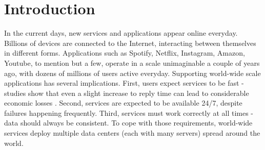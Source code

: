 
%

\chapter{Introduction}
\label{cha:introduction}





In the current days, new services and applications appear online everyday.
Billions of devices are connected to the Internet, interacting between themselves in different forms.
Applications such as Spotify, Netflix, Instagram, Amazon, Youtube, to mention but a few, operate in a scale unimaginable a couple of years ago, with dozens of millions of users active everyday.
Supporting world-wide scale applications has several implications.
First, users expect services to be fast - studies show that even a slight increase to reply time can lead to considerable economic losses \cite{dynamo, eiger}.
Second, services are expected to be available 24/7, despite failures happening frequently.
Third, services must work correctly at all times - data should always be consistent.
To cope with those requirements, world-wide services deploy multiple data centers (each with many servers) spread around the world.


